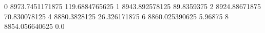 0 8973.7451171875 119.6884765625
1 8943.892578125 89.8359375
2 8924.88671875 70.830078125
4 8880.3828125 26.326171875
6 8860.025390625 5.96875
8 8854.056640625 0.0
